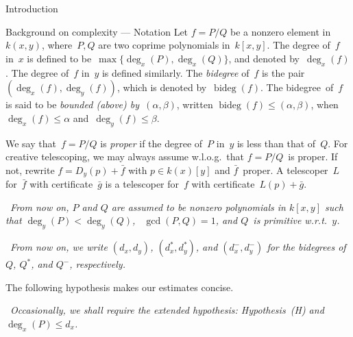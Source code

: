 \documentclass{sig-alt-full}
\newcommand{\bideg}{\operatorname{bideg}}
\begin{document}
\begin{section}{Introduction}
\begin{subsection}{Background on complexity --- Notation}
Let $f=P/Q$ be a nonzero element in~$k(x, y)$, where~$P, Q$ are two
coprime polynomials in~$k[x, y]$. The degree of~$f$ in~$x$ is
defined to be~$\max\{\deg_x(P), \deg_x(Q)\}$, and denoted
by~$\deg_x(f)$. The degree of~$f$ in~$y$ is defined similarly. The
\emph{bidegree\/} of~$f$ is the pair~$(\deg_x(f),\deg_y(f))$, which
is denoted by~$\bideg(f)$. The bidegree~of~$f$ is said to be
\emph{bounded (above) by~$(\alpha,\beta)$}, written
$\bideg(f)\leq(\alpha,\beta)$, when~$\deg_x (f) \le\alpha$
and~$\deg_y (f) \le\beta$.

We say that~$f=P/Q$ is \emph{proper\/} if the degree of~$P$ in~$y$ is
less than that of~$Q$.
For creative telescoping, we may always assume w.l.o.g.\ that
$f=P/Q$~is proper. If not, rewrite $f = D_y(p) + \bar f$ with $p\in
k(x)[y]$ and $\bar f$~proper. A telescoper~$L$ for~$\bar f$ with
certificate~$\bar g$ is a telescoper for~$f$ with certificate~$L(p) + \bar g$.

\medskip{} \ \emph{From now on, $P$ and
$Q$ are assumed to be nonzero polynomials in $k[x, y]$ such that
$\deg_y(P)<\deg_y(Q)$, \ $\gcd(P, Q)=1$, and $Q$~is primitive
w.r.t.\ $y$.}

\medskip{} \ \emph{From now on, we write $(d_x,
d_y)$, $(d_x^*, d_y^*)$, and $(d_x^-, d_y^-)$ for the bidegrees of
$Q$, $Q^*$, and $Q^-$, respectively.}

\medskip\noindent The following hypothesis makes our estimates
concise.

\medskip{} \ \emph{Occasionally, we shall
require the ex\-tend\-ed hypothesis: Hypothesis~(H) and
$\deg_x(P)\le d_x$.}
\end{subsection}

\end{section}
\end{document}
